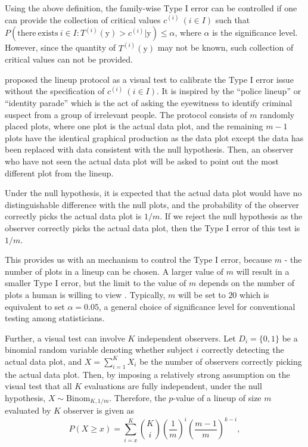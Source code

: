 \documentclass[]{interact}
\theoremstyle{plain}%
\theoremstyle{definition}
\theoremstyle{remark}
\begin{document}
Using the above definition, the family-wise Type I error can be
controlled if one can provide the collection of critical values
\(c^{(i)}~(i \in I)\) such that
\(P(\mathrm{there~exists~} i \in I: T^{(i)}(\boldsymbol{\mathrm{y}}) > c^{(i)}|\boldsymbol{\mathrm{y}}) \leq \alpha\),
where \(\alpha\) is the significance level. However, since the quantity
of \(T^{(i)}(\boldsymbol{\mathrm{y}})\) may not be known, such
collection of critical values can not be provided.

\citet{buja_statistical_2009} proposed the lineup protocol as a visual
test to calibrate the Type I error issue without the specification of
\(c^{(i)}~(i \in I)\). It is inspired by the ``police lineup'' or
``identity parade'' which is the act of asking the eyewitness to
identify criminal suspect from a group of irrelevant people. The
protocol consists of \(m\) randomly placed plots, where one plot is the
actual data plot, and the remaining \(m - 1\) plots have the identical
graphical production as the data plot except the data has been replaced
with data consistent with the null hypothesis. Then, an observer who
have not seen the actual data plot will be asked to point out the most
different plot from the lineup.

Under the null hypothesis, it is expected that the actual data plot
would have no distinguishable difference with the null plots, and the
probability of the observer correctly picks the actual data plot is
\(1/m\). If we reject the null hypothesis as the observer correctly
picks the actual data plot, then the Type I error of this test is
\(1/m\).

This provides us with an mechanism to control the Type I error, because
\(m\) - the number of plots in a lineup can be chosen. A larger value of
\(m\) will result in a smaller Type I error, but the limit to the value
of \(m\) depends on the number of plots a human is willing to view
\citep{buja_statistical_2009}. Typically, \(m\) will be set to \(20\)
which is equivalent to set \(\alpha = 0.05\), a general choice of
significance level for conventional testing among statisticians.

Further, a visual test can involve \(K\) independent observers. Let
\(D_i = \{0,1\}\) be a binomial random variable denoting whether subject
\(i\) correctly detecting the actual data plot, and
\(X = \sum_{i=1}^{K}X_i\) be the number of observers correctly picking
the actual data plot. Then, by imposing a relatively strong assumption
on the visual test that all \(K\) evaluations are fully independent,
under the null hypothesis, \(X \sim \mathrm{Binom}_{K,1/m}\). Therefore,
the \(p\)-value of a lineup of size \(m\) evaluated by \(K\) observer is
given as \begin{equation} \label{eq:pvaluesingle}
P(X \geq x) = \sum_{i=x}^{K}{{K}\choose{i}}\left(\frac{1}{m}\right)^i\left(\frac{m-1}{m}\right)^{k-i},
\end{equation}
\end{document}
